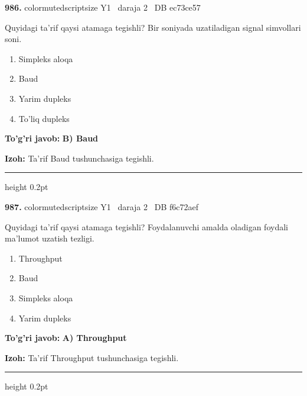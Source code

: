 \documentclass[10pt,a4paper,oneside]{article}
\begin{document}
\noindent\textbf{\color{ink}986.}  {color{muted}scriptsize Y1 \textbullet\ daraja 2 \textbullet\ DB ec73ce57}
\par
Quyidagi ta'rif qaysi atamaga tegishli? Bir soniyada uzatiladigan signal simvollari soni.
\begin{enumerate}[label=\Alph*),leftmargin=9mm]
\item Simpleks aloqa
\item Baud
\item Yarim dupleks
\item To'liq dupleks
\end{enumerate}
\begin{tcolorbox}[enhanced,breakable,colback=teal!4,colframe=teal!50!black,boxrule=0.5pt,arc=1.1mm,left=3mm,right=3mm,top=1.7mm,bottom=1.7mm,before skip=2mm,after skip=2mm]
\textbf{\color{teal}To'g'ri javob:} \textbf{B) Baud}
\par\smallskip
\textbf{Izoh:} Ta'rif Baud tushunchasiga tegishli.
\end{tcolorbox}
\vspace{2mm}\hrule height 0.2pt \vspace{3mm}

\noindent\textbf{\color{ink}987.}  {color{muted}scriptsize Y1 \textbullet\ daraja 2 \textbullet\ DB f6c72aef}
\par
Quyidagi ta'rif qaysi atamaga tegishli? Foydalanuvchi amalda oladigan foydali ma'lumot uzatish tezligi.
\begin{enumerate}[label=\Alph*),leftmargin=9mm]
\item Throughput
\item Baud
\item Simpleks aloqa
\item Yarim dupleks
\end{enumerate}
\begin{tcolorbox}[enhanced,breakable,colback=teal!4,colframe=teal!50!black,boxrule=0.5pt,arc=1.1mm,left=3mm,right=3mm,top=1.7mm,bottom=1.7mm,before skip=2mm,after skip=2mm]
\textbf{\color{teal}To'g'ri javob:} \textbf{A) Throughput}
\par\smallskip
\textbf{Izoh:} Ta'rif Throughput tushunchasiga tegishli.
\end{tcolorbox}
\vspace{2mm}\hrule height 0.2pt \vspace{3mm}
\end{document}
